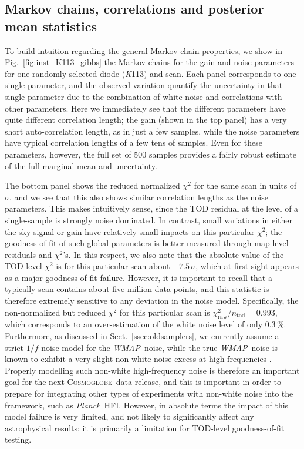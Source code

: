 \documentclass[twocolumn]{../../common/aa}
\def\WMAP{\emph{WMAP}}
\def\Planck{\emph{Planck}}
\newcommand{\cosmoglobe}{\textsc{Cosmoglobe}}
\newcommand{\K}[0]{\textit K}
\begin{document}
\subsection{Markov chains, correlations and posterior mean statistics}
\label{sec:summary_stats}

To build intuition regarding the general Markov chain properties, we show in Fig.~\ref{fig:inst_K113_gibbs} the Markov chains for the gain and noise parameters for one randomly selected diode (\K113) and scan. Each panel corresponds to one single parameter, and the observed variation quantify the uncertainty in that single parameter due to the combination of white noise and correlations with other parameters. Here we immediately see that the different parameters have quite different correlation length; the gain (shown in the top panel) has a very short auto-correlation length, as in just a few samples, while the noise parameters have typical correlation lengths of a few tens of samples. Even for these parameters, however, the full set of 500 samples provides a fairly robust estimate of the full marginal mean and uncertainty.

The bottom panel shows the reduced normalized $\chi^2$ for the same scan in units of $\sigma$, and we see that this also shows similar correlation lengths as the noise parameters. This makes intuitively sense, since the TOD residual at the level of a single-sample is strongly noise dominated. In contrast, small variations in either the sky signal or gain have relatively small impacts on this particular $\chi^2$; the goodness-of-fit of such global parameters is better measured through map-level residuals and $\chi^2$'s. In this respect, we also note that the absolute value of the TOD-level $\chi^2$ is for this particular scan about $-7.5\,\sigma$, which at first sight appears as a major goodness-of-fit failure. However, it is important to recall that a typically scan contains about five million data points, and this statistic is therefore extremely sensitive to any deviation in the noise model. Specifically, the non-normalized but reduced $\chi^2$ for this particular scan is $\chi_{\mathrm{raw}}^2/n_{\mathrm{tod}}=0.993$, which corresponds to an over-estimation of the white noise level of only 0.3\,\%. Furthermore, as discussed in Sect.~\ref{ssec:oldsamplers}, we currently assume a strict $1/f$ noise model for the \WMAP\ noise, while the true \WMAP\ noise is known to exhibit a very slight non-white noise excess at high frequencies \citep{bp17}. Properly modelling such non-white high-frequency noise is therefore an important goal for the next \cosmoglobe\ data release, and this is important in order to prepare for integrating other types of experiments with non-white noise into the framework, such as \Planck\ HFI. However, in absolute terms the impact of this model failure is very limited, and not likely to significantly affect any astrophysical results; it is primarily a limitation for TOD-level goodness-of-fit testing.
\end{document}
